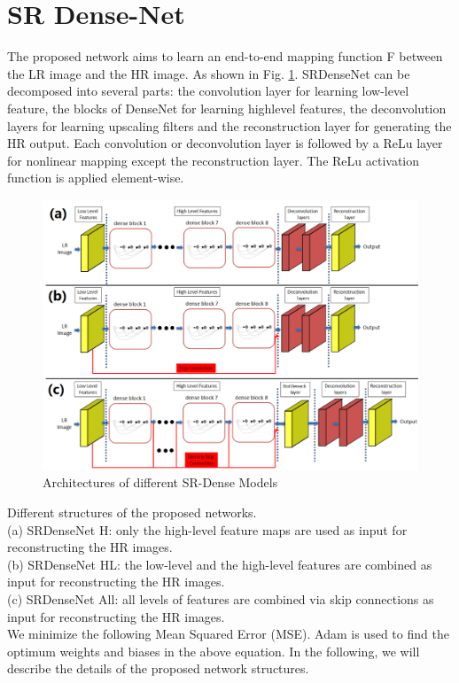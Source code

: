 \section{SR Dense-Net}
The proposed network aims to learn an end-to-end mapping function F between the LR image and the HR image. As shown in Fig. \ref{fig:test12}. SRDenseNet can be decomposed into several parts: the convolution layer for learning low-level feature, the blocks of DenseNet for learning highlevel features, the deconvolution layers for learning upscaling filters and the reconstruction layer for generating the HR output. Each convolution or deconvolution layer is followed by a ReLu layer for nonlinear mapping except the reconstruction layer. The ReLu activation function is applied element-wise. 
 \begin{figure}[H]
    \centering
    \includegraphics[totalheight=2.8in]{Chapter5/image21.png}
    \caption{Architectures of different SR-Dense Models}
    \label{fig:test12}
\end{figure}

Different structures of the proposed networks.\\
 (a) SRDenseNet H: only the high-level feature maps are used as input for reconstructing the HR images. \\
(b) SRDenseNet HL: the low-level and the high-level features are combined as input for reconstructing the HR images. \\
(c) SRDenseNet All: all levels of features are combined via skip connections as input for reconstructing the HR images. \\
We minimize the following Mean Squared Error (MSE). Adam is used to find the optimum weights and biases in the above equation. In the following, we will describe the details of the proposed network structures.

